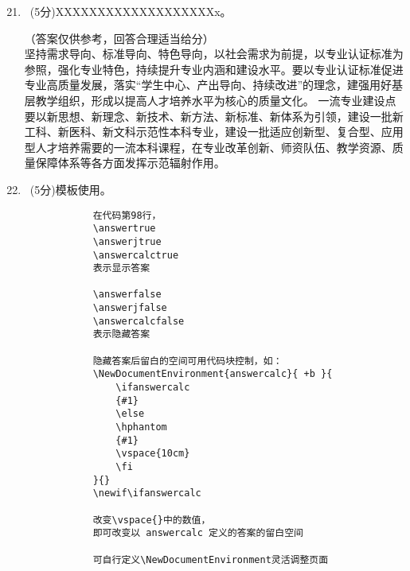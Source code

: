 \documentclass[twocolumn,landscape,UTF8]{article}
\newif\ifanswer
\newif\ifanswerj
\newif\ifanswercalc
\begin{document}
	\begin{enumerate}\setcounter{enumi}{20}
		
		\item ~(5分)XXXXXXXXXXXXXXXXXXXx。
		
		\begin{answerj}
			（答案仅供参考，回答合理适当给分）\\
			坚持需求导向、标准导向、特色导向，以社会需求为前提，以专业认证标准为参照，强化专业特色，持续提升专业内涵和建设水平。要以专业认证标准促进专业高质量发展，落实“学生中心、产出导向、持续改进”的理念，建强用好基层教学组织，形成以提高人才培养水平为核心的质量文化。
			一流专业建设点要以新思想、新理念、新技术、新方法、新标准、新体系为引领，建设一批新工科、新医科、新文科示范性本科专业，建设一批适应创新型、复合型、应用型人才培养需要的一流本科课程，在专业改革创新、师资队伍、教学资源、质量保障体系等各方面发挥示范辐射作用。
		\end{answerj}
		
		\item ~(5分)模板使用。
		
		\begin{lstlisting}
			在代码第98行，
			\answertrue
			\answerjtrue
			\answercalctrue
			表示显示答案
			
			\answerfalse
			\answerjfalse
			\answercalcfalse
			表示隐藏答案
			
			隐藏答案后留白的空间可用代码块控制，如：
			\NewDocumentEnvironment{answercalc}{ +b }{
				\ifanswercalc
				{#1}
				\else
				\hphantom
				{#1}
				\vspace{10cm}
				\fi
			}{}
			\newif\ifanswercalc
			
			改变\vspace{}中的数值，
			即可改变以 answercalc 定义的答案的留白空间
			
			可自行定义\NewDocumentEnvironment灵活调整页面
		\end{lstlisting}
		

		
		
	\end{enumerate}
	
	
	\vspace{2cm}
	\clearpage
	
\end{document}

